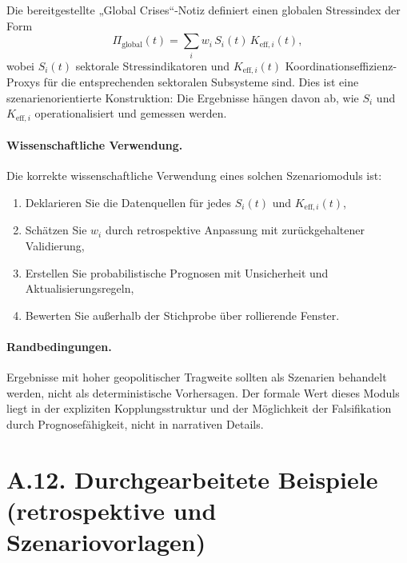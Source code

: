 \documentclass[13pt,a4paper]{article}
\begin{document}
	Die bereitgestellte „Global Crises“-Notiz definiert einen globalen Stressindex der Form
	$$ \Pi_{\mathrm{global}}(t) = \sum_i w_i\,S_i(t)\,K_{\mathrm{eff},i}(t), $$
	wobei $S_i(t)$ sektorale Stressindikatoren und $K_{\mathrm{eff},i}(t)$ Koordinationseffizienz-Proxys für die entsprechenden sektoralen Subsysteme sind. Dies ist eine szenarienorientierte Konstruktion: Die Ergebnisse hängen davon ab, wie $S_i$ und $K_{\mathrm{eff},i}$ operationalisiert und gemessen werden.
	
	\paragraph{Wissenschaftliche Verwendung.}
	Die korrekte wissenschaftliche Verwendung eines solchen Szenariomoduls ist:
	\begin{enumerate}[leftmargin=*]
		\item Deklarieren Sie die Datenquellen für jedes $S_i(t)$ und $K_{\mathrm{eff},i}(t)$,
		\item Schätzen Sie $w_i$ durch retrospektive Anpassung mit zurückgehaltener Validierung,
		\item Erstellen Sie probabilistische Prognosen mit Unsicherheit und Aktualisierungsregeln,
		\item Bewerten Sie außerhalb der Stichprobe über rollierende Fenster.
	\end{enumerate}
	
	\paragraph{Randbedingungen.}
	Ergebnisse mit hoher geopolitischer Tragweite sollten als Szenarien behandelt werden, nicht als deterministische Vorhersagen. Der formale Wert dieses Moduls liegt in der expliziten Kopplungsstruktur und der Möglichkeit der Falsifikation durch Prognosefähigkeit, nicht in narrativen Details.
	
	\section*{A.12. Durchgearbeitete Beispiele (retrospektive und Szenariovorlagen)}
	\label{sec:worked-examples}
	
\end{document}

